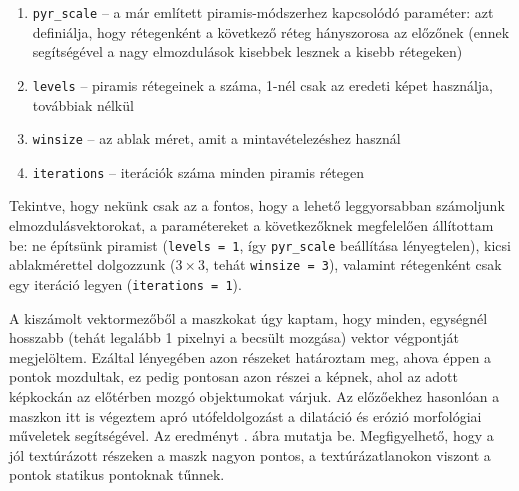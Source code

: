 \begin{enumerate}
\item \texttt{pyr\_scale} -- a már említett piramis-módszerhez kapcsolódó paraméter: azt definiálja, hogy rétegenként a következő réteg hányszorosa az előzőnek (ennek segítségével a nagy elmozdulások kisebbek lesznek a kisebb rétegeken)
\item \texttt{levels} -- piramis rétegeinek a száma, 1-nél csak az eredeti képet használja, továbbiak nélkül
\item \texttt{winsize} -- az ablak méret, amit a mintavételezéshez használ
\item \texttt{iterations} -- iterációk száma minden piramis rétegen
\end{enumerate}

Tekintve, hogy nekünk csak az a fontos, hogy a lehető leggyorsabban számoljunk elmozdulásvektorokat, a paramétereket a következőknek megfelelően állítottam be: ne építsünk piramist (\texttt{levels = 1}, így \texttt{pyr\_scale} beállítása lényegtelen), kicsi ablakmérettel dolgozzunk ($3\times 3$, tehát \texttt{winsize = 3}), valamint rétegenként csak egy iteráció legyen (\texttt{iterations = 1}).

A kiszámolt vektormezőből a maszkokat úgy kaptam, hogy minden, egységnél hosszabb (tehát legalább 1 pixelnyi a becsült mozgása) vektor végpontját megjelöltem. Ezáltal lényegében azon részeket határoztam meg, ahova éppen a pontok mozdultak, ez pedig pontosan azon részei a képnek, ahol az adott képkockán az előtérben mozgó objektumokat várjuk. Az előzőekhez hasonlóan a maszkon itt is végeztem apró utófeldolgozást a dilatáció és erózió morfológiai műveletek segítségével. Az eredményt . ábra mutatja be. Megfigyelhető, hogy a jól textúrázott részeken a maszk nagyon pontos, a textúrázatlanokon viszont a pontok statikus pontoknak tűnnek.

